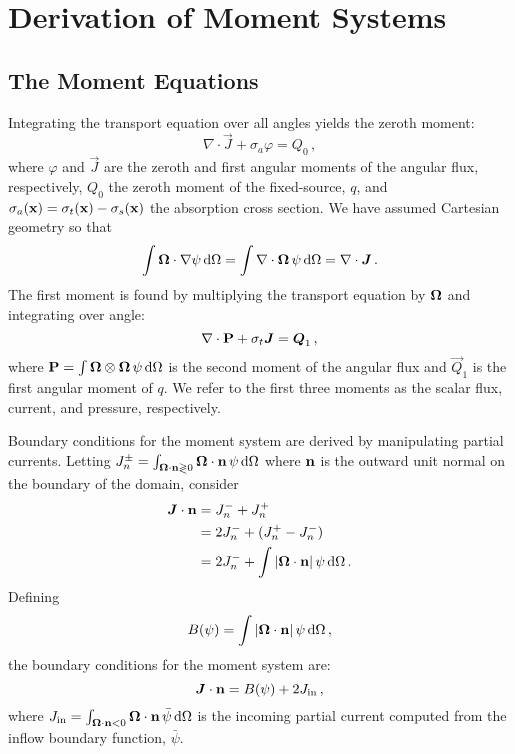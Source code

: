 \documentclass[../doc.tex]{subfiles}
\begin{document}
\section{Derivation of Moment Systems}
\subsection{The Moment Equations}
Integrating the transport equation over all angles yields the zeroth moment: 
	\begin{equation}
		\nabla\cdot\vec{J} + \sigma_a \varphi = Q_0 \,,
	\end{equation}
where $\varphi$ and $\vec{J}$ are the zeroth and first angular moments of the angular flux, respectively, $Q_0$ the zeroth moment of the fixed-source, $q$, and $\sigma_a(\x) = \sigma_t(\x) - \sigma_s(\x)$ the absorption cross section. 
We have assumed Cartesian geometry so that
	\begin{equation}
		\int \Omegahat\cdot\nabla\psi \ud \Omega = \int \nabla\cdot\Omegahat\,\psi \ud \Omega = \nabla\cdot \vec{J} \,. 
	\end{equation}
The first moment is found by multiplying the transport equation by $\Omegahat$ and integrating over angle: 
	\begin{equation}
		\nabla\cdot\P + \sigma_t \vec{J} = \vec{Q}_1 \,, 
	\end{equation}
where $\P = \int \Omegahat\otimes\Omegahat\, \psi \ud \Omega$ is the second moment of the angular flux and $\vec{Q}_1$ is the first angular moment of $q$. We refer to the first three moments as the scalar flux, current, and pressure, respectively. 

Boundary conditions for the moment system are derived by manipulating partial currents. Letting $J_n^\pm = \int_{\Omegahat\cdot\n\gtrless 0} \Omegahat\cdot\n\, \psi \ud \Omega$ where $\n$ is the outward unit normal on the boundary of the domain, consider 
	\begin{equation}
	\begin{aligned}
		\vec{J}\cdot\n &= J_n^- + J_n^+ \\
		&= 2 J_n^- + (J_n^+ - J_n^-) \\
		&= 2 J_n^- + \int |\Omegahat\cdot\n|\,\psi \ud \Omega \,. 
	\end{aligned}
	\end{equation}
Defining
	\begin{equation}
		B(\psi) = \int |\Omegahat\cdot\n|\, \psi \ud \Omega \,,
	\end{equation}
the boundary conditions for the moment system are: 
	\begin{equation}
		\vec{J}\cdot\n = B(\psi) + 2\Jin \,,
	\end{equation}
where $\Jin = \int_{\Omegahat\cdot\n<0} \Omegahat\cdot\n\, \bar{\psi}\ud\Omega$ is the incoming partial current computed from the inflow boundary function, $\bar{\psi}$. 
\end{document}
